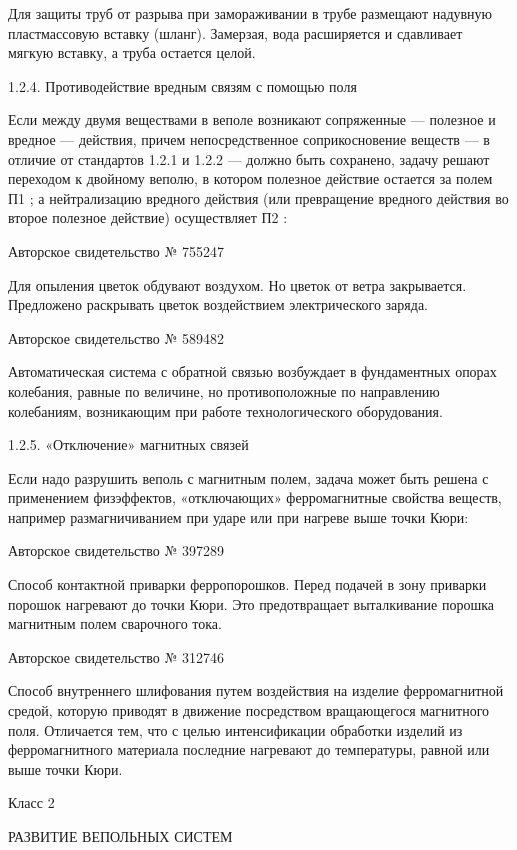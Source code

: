 Для  защиты  труб  от  разрыва при  замораживании  в  трубе  размещают
надувную пластмассовую  вставку (шланг). Замерзая, вода  расширяется и
сдавливает мягкую вставку, а труба остается целой.

1.2.4. Противодействие вредным связям с помощью поля

Если между двумя веществами в  веполе возникают сопряженные — полезное
и вредное — действия,  причем непосредственное соприкосновение веществ
—  в отличие  от стандартов  1.2.1 и  1.2.2 —  должно быть  сохранено,
задачу  решают  переходом  к   двойному  веполю,  в  котором  полезное
действие  остается за  полем П1  ; а  нейтрализацию вредного  действия
(или  превращение  вредного  действия  во  второе  полезное  действие)
осуществляет П2 :


Авторское свидетельство № 755247

Для опыления цветок обдувают воздухом. Но цветок от ветра закрывается.
Предложено раскрывать цветок воздействием электрического заряда.


Авторское свидетельство № 589482

Автоматическая  система с  обратной связью  возбуждает в  фундаментных
опорах   колебания,  равные   по  величине,   но  противоположные   по
направлению  колебаниям,   возникающим  при   работе  технологического
оборудования.

1.2.5. «Отключение» магнитных связей

Если надо разрушить веполь с магнитным полем, задача может быть решена
с  применением  физэффектов,   «отключающих»  ферромагнитные  свойства
веществ,  например размагничиванием  при  ударе или  при нагреве  выше
точки Кюри:


Авторское свидетельство № 397289

Способ  контактной  приварки  ферропорошков.   Перед  подачей  в  зону
приварки   порошок  нагревают   до  точки   Кюри.  Это   предотвращает
выталкивание порошка магнитным полем сварочного тока.


Авторское свидетельство № 312746

Способ   внутреннего   шлифования   путем   воздействия   на   изделие
ферромагнитной  средой,   которую  приводят  в   движение  посредством
вращающегося   магнитного   поля.   Отличается  тем,   что   с   целью
интенсификации   обработки   изделий  из   ферромагнитного   материала
последние нагревают до температуры, равной или выше точки Кюри.

Класс 2

РАЗВИТИЕ ВЕПОЛЬНЫХ СИСТЕМ

